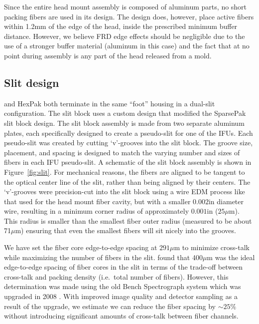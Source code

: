 Since the entire \GP head mount assembly is composed of aluminum parts, no
short packing fibers are used in its design.  The design does, however, place
active fibers within 1.2mm of the edge of the head, inside the prescribed
minimum buffer distance.  However, we believe FRD edge effects should be
negligible due to the use of a stronger buffer material (aluminum in this
case) and the fact that at no point during assembly is any part of the \GP
head released from a mold.


\subsection{Slit design} 
\label{GPBsub:sec:slit}

\GP and HexPak both terminate in the same ``foot'' housing in a dual-slit
configuration.  The slit block uses a custom design that modified the
SparsePak slit block design.  The slit block assembly is made from two
separate aluminum plates, each specifically designed to create a pseudo-slit
for one of the IFUs.  Each pseudo-slit was created by cutting `v'-grooves into
the slit block.  The groove size, placement, and spacing is designed to match
the varying number and sizes of fibers in each IFU pseudo-slit.  A schematic
of the slit block assembly is shown in Figure~\ref{fig:slit}.  For mechanical
reasons, the fibers are aligned to be tangent to the optical center line of the
slit, rather than being aligned by their centers.  The `v'-grooves were
precision-cut into the slit block using a wire EDM process like that used for
the \GP head mount fiber cavity, but with a smaller $0.002$in diameter
wire, resulting in a minimum corner radius of approximately $0.001$in
($25\mu$m).  This radius is smaller than the smallest fiber outer radius
(measured to be about 71$\mu$m) ensuring that even the smallest fibers will
sit nicely into the grooves.


We have set the fiber core edge-to-edge spacing at $291\mu$m to minimize
cross-talk while maximizing the number of fibers in the slit.
\citet{Bershady04} found that 400$\mu$m was the ideal edge-to-edge
spacing of fiber cores in the slit in terms of the trade-off between
cross-talk and packing density (i.e.\ total number of fibers).  However, this
determination was made using the old Bench Spectrograph system which was
upgraded in 2008 \citep{Bershady08}.  With improved image quality and detector
sampling as a result of the upgrade, we estimate we can reduce the fiber
spacing by $\sim25\%$ without introducing significant amounts of cross-talk
between fiber channels.


